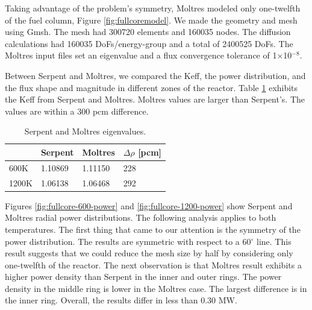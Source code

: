 Taking advantage of the problem's symmetry, Moltres modeled only one-twelfth of the fuel column, Figure \ref{fig:fullcoremodel}.
We made the geometry and mesh using Gmsh.
The mesh had 300720 elements and 160035 nodes.
The diffusion calculations had 160035 \glspl{DoF}/energy-group and a total of 2400525 DoFs.
The Moltres input files set an eigenvalue and a flux convergence tolerance of 1$\times$10$^{-8}$.

Between Serpent and Moltres, we compared the \gls{Keff}, the power distribution, and the flux shape and magnitude in different zones of the reactor.
Table \ref{tab:full-keff} exhibits the \gls{Keff} from Serpent and Moltres.
Moltres values are larger than Serpent's.
The values are within a 300 pcm difference.

\begin{table}[htbp!]
  \centering
  \caption{Serpent and Moltres eigenvalues.}
  \begin{tabular}{l|lll}
  \toprule
              & Serpent			& Moltres  & $\Delta \rho$ [pcm] 	\\
  \midrule
			 600K  	& 1.10869     & 1.11150	 &	228		\\
			1200K 	& 1.06138     & 1.06468	 &	292   \\

  \bottomrule
  \end{tabular}
  \label{tab:full-keff}
\end{table}

Figures \ref{fig:fullcore-600-power} and \ref{fig:fullcore-1200-power} show Serpent and Moltres radial power distributions.
The following analysis applies to both temperatures.
The first thing that came to our attention is the symmetry of the power distribution.
The results are symmetric with respect to a 60$^{\circ}$ line.
This result suggests that we could reduce the mesh size by half by considering only one-twelfth of the reactor.
The next observation is that Moltres result exhibits a higher power density than Serpent in the inner and outer rings.
The power density in the middle ring is lower in the Moltres case.
The largest difference is in the inner ring.
Overall, the results differ in less than 0.30 MW.

